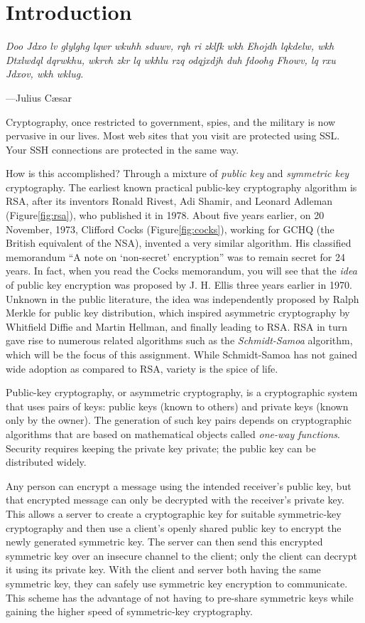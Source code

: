 \section{Introduction}

\textwidth
\epigraph{\emph{Doo Jdxo lv glylghg lqwr wkuhh sduwv, rqh ri zklfk wkh Ehojdh lqkdelw, wkh Dtxlwdql dqrwkhu, wkrvh zkr lq wkhlu rzq odqjxdjh duh fdoohg Fhowv, lq rxu Jdxov, wkh wklug.}}{---Julius C{\ae}sar}

\noindent
Cryptography, once restricted to government, spies, and the military is
now pervasive in our lives. Most web sites that you visit are protected
using SSL. Your SSH connections are protected in the same way.

How is this accomplished? Through a mixture of \emph{public key} and
\emph{symmetric key} cryptography. The earliest known practical
public-key cryptography algorithm is RSA, after its inventors Ronald
Rivest, Adi Shamir, and Leonard Adleman (Figure\xspace\ref{fig:rsa}),
who published it in 1978. About
five years earlier, on 20 November, 1973, Clifford Cocks (Figure\xspace\ref{fig:cocks}), working for
GCHQ (the British equivalent of the NSA), invented a very similar
algorithm. His classified memorandum ``A note on `non-secret'
encryption'' was to remain secret for 24 years. In fact, when you read
the Cocks memorandum, you will see that the \emph{idea} of public key
encryption was proposed by J.\xspace H.\xspace Ellis three years earlier
in 1970. Unknown in the public literature, the idea was independently
proposed by Ralph Merkle for public key distribution, which inspired
asymmetric cryptography by Whitfield Diffie and Martin Hellman, and
finally leading to RSA.
RSA in turn gave rise to numerous related algorithms such as the \emph{Schmidt-Samoa} algorithm,
which will be the focus of this assignment.
While Schmidt-Samoa has not gained wide adoption as compared to RSA,
variety is the spice of life.

Public-key cryptography, or asymmetric cryptography, is a cryptographic
system that uses pairs of keys: public keys (known to others) and
private keys (known only by the owner). The generation of such key pairs
depends on cryptographic algorithms that are based on mathematical
objects called \emph{one-way functions}. Security requires keeping the
private key private; the public key can be distributed widely.

Any person can encrypt a message using the intended receiver's public
key, but that encrypted message can only be decrypted with the
receiver's private key. This allows a server to create a cryptographic
key for suitable symmetric-key cryptography and then use a client's
openly shared public key to encrypt the newly generated symmetric key.
The server can then send this encrypted symmetric key over an insecure
channel to the client; only the client can decrypt it using its private
key. With the client and server both having the same symmetric key, they
can safely use symmetric key encryption to communicate. This scheme has
the advantage of not having to pre-share symmetric keys while gaining the
higher speed of symmetric-key cryptography.

